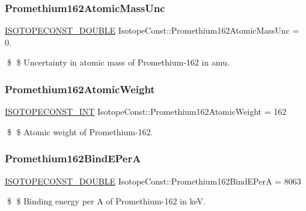 \subsubsection{\texorpdfstring{Promethium162\+Atomic\+Mass\+Unc}{Promethium162AtomicMassUnc}}
{\footnotesize\ttfamily \mbox{\hyperlink{group___isotope_const-_macros_ga8f45a7272ce02c0b4c65c44636ed719a}{I\+S\+O\+T\+O\+P\+E\+C\+O\+N\+S\+T\+\_\+\+D\+O\+U\+B\+LE}} Isotope\+Const\+::\+Promethium162\+Atomic\+Mass\+Unc = 0.}

\$ \$ Uncertainty in atomic mass of Promethium-\/162 in amu. \mbox{\label{group___isotope_const-_promethium-_pm162_ga0e86ff697e97b1bd37244df235bbaf2f}} 
\subsubsection{\texorpdfstring{Promethium162\+Atomic\+Weight}{Promethium162AtomicWeight}}
{\footnotesize\ttfamily \mbox{\hyperlink{group___isotope_const-_macros_ga5f18360b3e99483a35c32d789e62621c}{I\+S\+O\+T\+O\+P\+E\+C\+O\+N\+S\+T\+\_\+\+I\+NT}} Isotope\+Const\+::\+Promethium162\+Atomic\+Weight = 162}

\$ \$ Atomic weight of Promethium-\/162. \mbox{\label{group___isotope_const-_promethium-_pm162_ga84da5b46d7ca50d3b9af30f70542cd34}} 
\subsubsection{\texorpdfstring{Promethium162\+Bind\+E\+PerA}{Promethium162BindEPerA}}
{\footnotesize\ttfamily \mbox{\hyperlink{group___isotope_const-_macros_ga8f45a7272ce02c0b4c65c44636ed719a}{I\+S\+O\+T\+O\+P\+E\+C\+O\+N\+S\+T\+\_\+\+D\+O\+U\+B\+LE}} Isotope\+Const\+::\+Promethium162\+Bind\+E\+PerA = 8063}

\$ \$ Binding energy per A of Promethium-\/162 in keV. \mbox{\label{group___isotope_const-_promethium-_pm162_ga34b8c71d88767fcc0d5dc50bc588b6a8}} 
